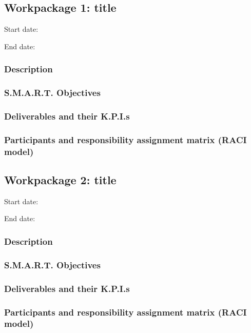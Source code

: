 \subsection{Workpackage 1: title}
Start date:

End date:
\subsubsection{Description}
\subsubsection{S.M.A.R.T. Objectives}
\subsubsection{Deliverables and their K.P.I.s}
\subsubsection{Participants and responsibility assignment matrix (RACI model)}
\subsection{Workpackage 2: title}
Start date:

End date:
\subsubsection{Description}
\subsubsection{S.M.A.R.T. Objectives}
\subsubsection{Deliverables and their K.P.I.s}
\subsubsection{Participants and responsibility assignment matrix (RACI model)}
